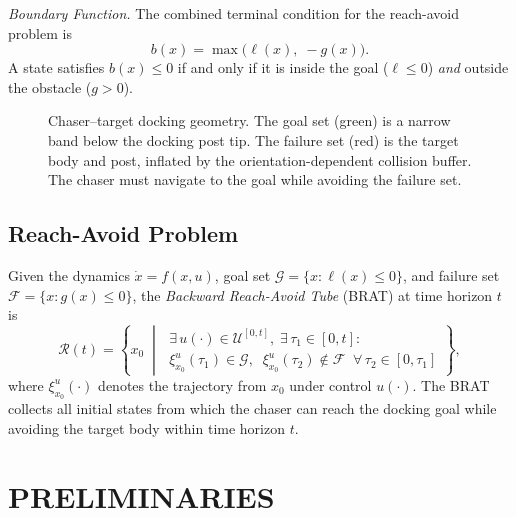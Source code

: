 \documentclass[letterpaper, 10 pt, conference]{ieeeconf}
\begin{document}
\textit{Boundary Function.}
The combined terminal condition for the reach-avoid problem is
\begin{equation}\label{eq:boundary}
b(x) = \max\!\big(\ell(x),\; -g(x)\big).
\end{equation}
A state satisfies $b(x) \leq 0$ if and only if it is inside the goal ($\ell \leq 0$) \emph{and} outside the obstacle ($g > 0$).

   \begin{figure}[t]
      \centering
      \caption{Chaser--target docking geometry. The goal set (green) is a narrow band below the docking post tip. The failure set (red) is the target body and post, inflated by the orientation-dependent collision buffer. The chaser must navigate to the goal while avoiding the failure set.}
      \label{fig:geometry}
   \end{figure}

\subsection{Reach-Avoid Problem}

Given the dynamics $\dot{x} = f(x, u)$, goal set $\mathcal{G} = \{x : \ell(x) \leq 0\}$, and failure set $\mathcal{F} = \{x : g(x) \leq 0\}$, the \emph{Backward Reach-Avoid Tube} (BRAT) at time horizon $t$ is
\begin{equation}\label{eq:brat}
\mathcal{R}(t) = \left\{ x_0 \;\middle|\;
\begin{array}{l}
\exists\, u(\cdot) \in \mathcal{U}^{[0,t]},\;\exists\, \tau_1 \in [0,t]: \\
\xi_{x_0}^u(\tau_1) \in \mathcal{G},\;\; \xi_{x_0}^u(\tau_2) \notin \mathcal{F}\;\;\forall\, \tau_2 \in [0, \tau_1]
\end{array}
\right\},
\end{equation}
where $\xi_{x_0}^u(\cdot)$ denotes the trajectory from $x_0$ under control $u(\cdot)$. The BRAT collects all initial states from which the chaser can reach the docking goal while avoiding the target body within time horizon $t$.

\section{PRELIMINARIES}
\end{document}
